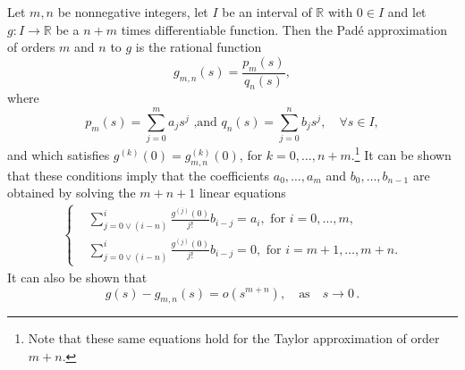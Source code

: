 \documentclass[preprint,12pt]{elsarticle}
\numberwithin{equation}{section}
\theoremstyle{plain} \newtheorem{theorem}{Theorem}[section]
\theoremstyle{plain} \newtheorem{proposition}[theorem]{Proposition}
\theoremstyle{plain} \newtheorem{lemma}[theorem]{Lemma}
\theoremstyle{plain} \newtheorem{corollary}[theorem]{Corollary}
\theoremstyle{definition} \newtheorem{definition}[theorem]{Definition}
\theoremstyle{definition} \newtheorem{notation}[theorem]{Notation}
\theoremstyle{remark} \newtheorem{remark}[theorem]{Remark}
\theoremstyle{remark} \newtheorem{remarks}[theorem]{Remarks}
\theoremstyle{remark} \newtheorem{algorithm2}[theorem]{Algorithm}
\theoremstyle{remark} \newtheorem{example}[theorem]{Example}
\begin{document}
    Let $m,n$ be nonnegative integers, let $I$ be an interval of $\mathbb{R}$ with $0 \in I$ and let $g : I \rightarrow \mathbb{R}$ be a $n+m$ times differentiable function.
 Then the Pad\'e approximation of orders 
 $m$ and $n$ to $g$ is the rational function 
    \begin{equation}
    \label{eq:pade}
	g_{m,n}(s)=\frac{p_m(s)}{q_n(s)},
 \end{equation}
 where
 $$p_m(s) = \sum_{j=0}^m a_j s^j \text{ ,and } 
 q_n(s) = \sum_{j=0}^n b_j s^j, \quad \forall s \in I,$$
 and 
 which satisfies $g^{(k)}(0) = g_{m,n}^{(k)}(0)$,
    for $k = 0, \ldots, n+m$.\footnote{Note that these same
    equations hold for the Taylor approximation
of order $m+n$.}
It can be shown that
these conditions imply that 
the coefficients $a_0, \ldots, a_m$ and $b_0,\ldots,b_{n-1}$ are 
obtained by solving the $m+n+1$ linear equations
\begin{align}                       \label{coeff}
    \left\{
    \begin{aligned}
        &\sum_{j=0\vee (i-n)}^i \frac{g^{(j)}(0)}{j!} b_{i-j} = a_i, \text{ for } i=0,\dots,m,
        \\
        &\sum_{j=0\vee (i-n)}^i \frac{g^{(j)}(0)}{j!} b_{i-j} = 0, \text{ for } i=m+1,\dots,m+n.
    \end{aligned}
    \right.
\end{align}
It can also be shown that
\[
    g(s)-g_{m,n}(s)=o(s^{m+n}),\quad\text{as}\quad s\to 0\,.
\]
\end{document}
